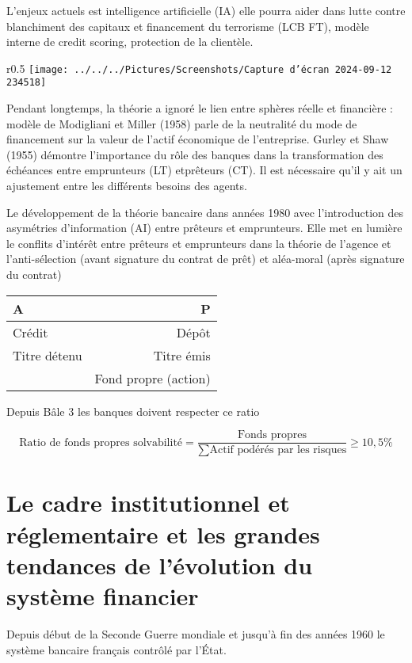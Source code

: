 \documentclass[a4paper, 12pt]{report}
\begin{document}
L'enjeux actuels est intelligence artificielle (IA) elle pourra aider dans lutte contre blanchiment des capitaux et financement du terrorisme (LCB FT), modèle interne de credit scoring, protection de la clientèle.

\begin{wrapfigure}{r}{0.5\textwidth}
 \centering
	\texttt{[image: ../../../Pictures/Screenshots/Capture d'écran 2024-09-12 234518]}
\end{wrapfigure}

Pendant longtemps, la théorie a ignoré le lien entre sphères réelle et financière : modèle de Modigliani et Miller (1958) parle de la neutralité du mode de financement sur la valeur de l’actif économique de l’entreprise. Gurley et Shaw (1955) démontre l'importance du rôle des banques dans la transformation des échéances entre emprunteurs (LT) etprêteurs (CT). Il est nécessaire qu'il y ait un ajustement entre les différents besoins des agents.

Le développement de la théorie bancaire dans années 1980 avec l’introduction des asymétries d’information (AI) entre prêteurs et emprunteurs. Elle met en lumière le conflits d’intérêt entre prêteurs et emprunteurs dans la théorie de
l’agence et l'anti-sélection (avant signature du contrat de prêt) et aléa-moral (après signature du contrat)

\begin{center}
	\begin{tabular}{lr}
	A                                 & P                    \\ \hline
	\multicolumn{1}{l|}{Crédit}       & Dépôt                \\
	\multicolumn{1}{l|}{Titre détenu} & Titre émis           \\
	\multicolumn{1}{l|}{}             & Fond propre (action)
\end{tabular}
\end{center}
Depuis Bâle 3 les banques doivent respecter ce ratio 

$$
\text{Ratio de fonds propres solvabilité}= \frac{\text{Fonds propres}}{\sum \text{Actif podérés par les risques}}\ge 10,5\%
$$

\chapter{Le cadre institutionnel et réglementaire et les grandes tendances de l’évolution du système financier}

Depuis début de la Seconde Guerre mondiale et jusqu'à fin des années 1960 le système bancaire français contrôlé par l’État. 
\end{document}
